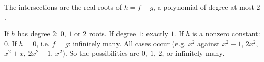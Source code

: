 The intersections are the real roots of $h=f-g$, a polynomial of degree at most $2$.

If $h$ has degree $2$: $0$, $1$ or $2$ roots. If degree $1$: exactly $1$. If $h$ is a nonzero constant: $0$. If $h=0$, i.e. $f=g$: infinitely many. All cases occur (e.g. $x^2$ against $x^2+1$, $2x^2$, $x^2+x$, $2x^2-1$, $x^2$). So the possibilities are $\boxed{0,\ 1,\ 2,\ \text{or infinitely many}}$.

